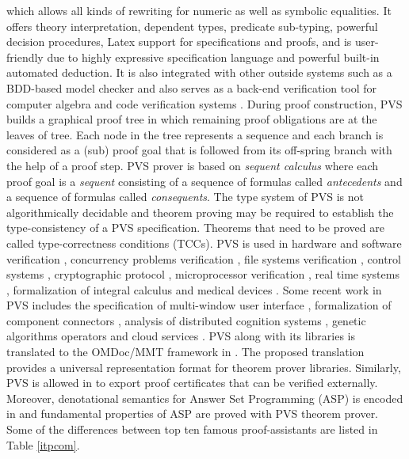 which allows all kinds of rewriting for numeric as well as symbolic equalities. 
It offers theory interpretation, dependent types, predicate sub-typing, powerful decision procedures, Latex 
support for specifications and proofs, and is user-friendly due to highly expressive specification language and powerful built-in automated deduction. It is also
integrated with other outside systems such as a BDD-based model checker and also serves as a back-end verification tool for computer algebra and code 
verification systems . 
During proof construction, PVS builds a graphical proof tree in which remaining proof obligations are at the leaves of tree.
Each node in the tree represents a sequence and each branch is considered as a (sub) proof 
goal that is followed from its off-spring branch with the help of a proof step.
PVS prover is based on \emph{sequent calculus} where each proof goal is a \emph{sequent} consisting of a sequence of formulas
called \emph{antecedents} and a sequence of formulas called {\em consequents}. The type system of PVS is not algorithmically decidable and theorem proving may be 
required to establish the type-consistency of a PVS specification. Theorems that need to be proved are called type-correctness conditions (TCCs). 
PVS is used in hardware and software verification , concurrency problems verification , 
file systems verification , control systems , cryptographic protocol ,
microprocessor verification , real time systems , formalization of integral calculus 
 and medical devices .
Some recent work in PVS includes the specification of multi-window user interface , formalization of component connectors , 
analysis of distributed cognition systems , genetic algorithms operators  and cloud services .  
PVS along with its libraries is translated to the OMDoc/MMT framework in . The proposed translation 
provides a universal representation format for theorem prover libraries.
Similarly, PVS is allowed in  to export proof certificates that can be verified externally.
Moreover, denotational semantics for Answer Set Programming (ASP) is encoded in  and fundamental 
properties of ASP are proved with PVS theorem prover. 
Some of the differences between top ten famous proof-assistants are listed in Table \ref{itpcom}. 
